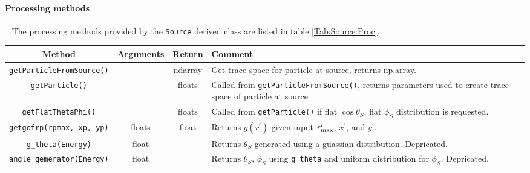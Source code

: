 \paragraph{Processing methods} ~\newline
\noindent
The processing methods provided by the \texttt{Source} derived class
are listed in table \ref{Tab:Source:Proc}.
\begin{sidewaystable}[h]
  \caption{
    Definition of processing methods provided by the \texttt{Source}
    derived class. 
  }
  \label{Tab:Source:Proc}
  \begin{center}
    \begin{tabular}{|c|c|c|p{7cm}|}
      \hline
      \textbf{Method} & \textbf{Arguments} & \textbf{Return}  & \textbf{Comment}                                                 \\
      \hline
      \texttt{getParticleFromSource()}       &         & ndarray       & Get trace space for particle at source, returns np.array.         \\
      \texttt{getParticle()}                 &         & floats        & Called from \texttt{getParticleFromSource()}, returns parameters
                                                                         used to create trace space of particle at source.                 \\
      \texttt{getFlatThetaPhi()}             &         & floats        & Called from \texttt{getParticle()} if flat $\cos\theta_S$, flat
                                                                         $\phi_S$ distribution is requested.                               \\
      \texttt{getgofrp(rpmax, xp, yp)}       & floats  & float         & Returns $g(r^\prime)$ given input $r^\prime_{\rm max}$, $x^\prime$,
                                                                         and $y^\prime$.                                                    \\
      \texttt{g\_theta(Energy)}              & float   &               & Returns $\theta_S$ generated using a guassian distribution.
                                                                         Depricated.                                                       \\
      \texttt{angle\_gemerator(Energy)}      & float   &               & Returns $\theta_S$, $\phi_S$ using \texttt{g\_theta} and uniform
                                                                         distribution for $\phi_S$.  Depricated.                           \\

\end{tabular}
\end{center}
\end{sidewaystable}
